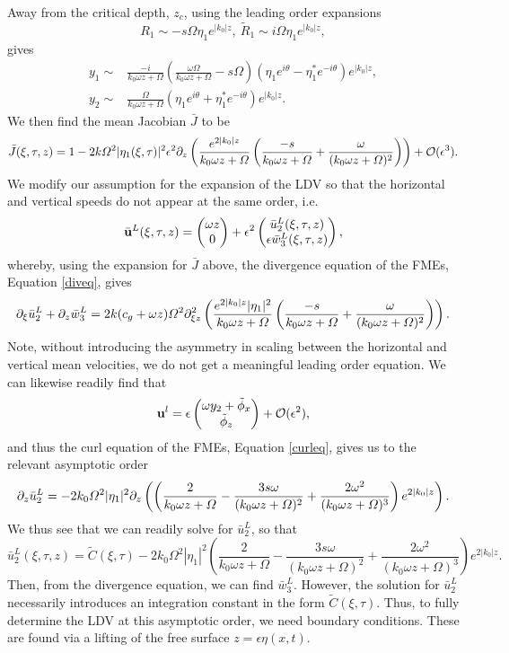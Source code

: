 \documentclass{JFM_Style/jfm}
\newcommand{\bp}{\begin{pmatrix}}
\newcommand{\ep}{\end{pmatrix}}
\begin{document}
Away from the critical depth, $z_{c}$, using the leading order expansions
\[
R_{1} \sim -s\Omega\eta_{1}e^{|k_{0}|z}, ~ \tilde{R}_{1} \sim i\Omega\eta_{1}e^{|k_{0}|z},
\]
gives
\begin{align*}
y_{1} \sim & \frac{-i}{k_{0}\omega z + \Omega}\left(\frac{\omega\Omega}{k_{0}\omega z + \Omega} - s\Omega \right)(\eta_{1}e^{i\theta} - \eta_{1}^{\ast}e^{-i\theta})e^{|k_{0}|z},\\
y_{2} \sim & \frac{\Omega}{k_{0}\omega z + \Omega}(\eta_{1}e^{i\theta} + \eta^{\ast}_{1}e^{-i\theta})e^{|k_{0}|z}.
\end{align*}
We then find the mean Jacobian $\bar{J}$ to be 
\[
\bar{J}(\xi,\tau,z) = 1 -2k\varOmega^{2}|\eta_{1}(\xi,\tau)|^{2}\epsilon^{2}\partial_{z}\left(\frac{e^{2|k_{0}|z}}{k_{0}\omega z + \varOmega}\left(\frac{-s}{k_{0}\omega z + \varOmega} + \frac{\omega}{(k_{0}\omega z + \varOmega)^{2}}\right)\right) + \mathcal{O}(\epsilon^{3}).
\]
We modify our assumption for the expansion of the LDV so that the horizontal and vertical speeds do not appear at the same order, i.e. 
\[
\bar{{\bf u}}^{L}(\xi,\tau,z) = \bp \omega z \\ 0 \ep + \epsilon^{2} \bp \bar{u}^{L}_{2}(\xi,\tau,z) \\ \epsilon \bar{w}^{L}_{3}(\xi,\tau,z)\ep,
\]
whereby, using the expansion for $\bar{J}$ above, the divergence equation of the FMEs, Equation \eqref{diveq}, gives 
\[
\partial_{\xi}\bar{u}^{L}_{2} + \partial_{z}\bar{w}^{L}_{3} = 2k(c_{g}+\omega z)\varOmega^{2}\partial_{\xi z}^{2}\left(\frac{e^{2|k_{0}|z}|\eta_{1}|^{2}}{k_{0}\omega z + \varOmega}\left(\frac{-s}{k_{0}\omega z + \varOmega} + \frac{\omega}{(k_{0}\omega z + \varOmega)^{2}}\right)\right) .
\]
Note, without introducing the asymmetry in scaling between the horizontal and vertical mean velocities, we do not get a meaningful leading order equation.  We can likewise readily find that
\[
{\bf u}^{l} = \epsilon \bp \omega y_{2} + \tilde{\phi}_{x} \\ \tilde{\phi}_{z} \ep + \mathcal{O}(\epsilon^{2}),
\]
and thus the curl equation of the FMEs, Equation \eqref{curleq}, gives us to the relevant asymptotic order
\[
\partial_{z}\bar{u}^{L}_{2} =  -2k_{0}\varOmega^{2} |\eta_{1}|^{2}\partial_{z}\left(\left(\frac{2}{k_{0}\omega z + \varOmega} - \frac{3s\omega}{(k_{0}\omega z + \varOmega)^{2}}+\frac{2\omega^{2}}{(k_{0}\omega z + \varOmega)^{3}}\right)e^{2|k_{0}|z}\right).
\]
We thus see that we can readily solve for $\bar{u}^{L}_{2}$, so that
\[
\bar{u}^{L}_{2}(\xi,\tau,z) = \tilde{C}(\xi,\tau)  -2k_{0}\Omega^{2} |\eta_{1}|^{2} \left(\frac{2}{k_{0}\omega z + \Omega} - \frac{3s\omega}{(k_{0}\omega z + \Omega)^{2}}+\frac{2\omega^{2}}{(k_{0}\omega z + \Omega)^{3}}\right)e^{2|k_{0}|z}.
\]
Then, from the divergence equation, we can find $\bar{w}^{L}_{3}$.  However, the solution for $\bar{u}^{L}_{2}$ necessarily introduces an integration constant in the form $\tilde{C}(\xi,\tau)$.  Thus, to fully determine the LDV at this asymptotic order, we need boundary conditions.  These are found via a lifting of the free surface $z=\epsilon \eta(x,t)$.
\end{document}
